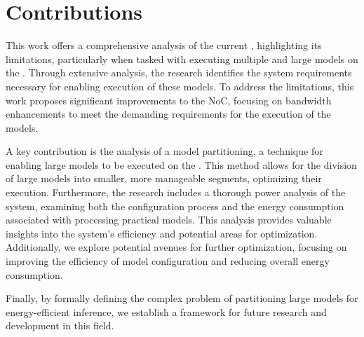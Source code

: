 \section{Contributions}


This work offers a comprehensive analysis of the current \confignoc{}, highlighting its limitations, particularly when tasked with executing multiple and large models on the \graicore{}.
Through extensive analysis, the research identifies the system requirements necessary for enabling execution of these models.
To address the limitations, this work proposes significant improvements to the NoC, focusing on bandwidth enhancements to meet the demanding requirements for the execution of the models.

A key contribution is the analysis of a model partitioning, a technique for enabling large models to be executed on the \graicore{}.
This method allows for the division of large models into smaller, more manageable segments, optimizing their execution. 
Furthermore, the research includes a thorough power analysis of the system, examining both the configuration process and the energy consumption associated with processing practical models.
This analysis provides valuable insights into the system's efficiency and potential areas for optimization.
Additionally, we explore potential avenues for further optimization, focusing on improving the efficiency of model configuration and reducing overall energy consumption.

Finally, by formally defining the complex problem of partitioning large models for energy-efficient inference, we establish a framework for future research and development in this field.







